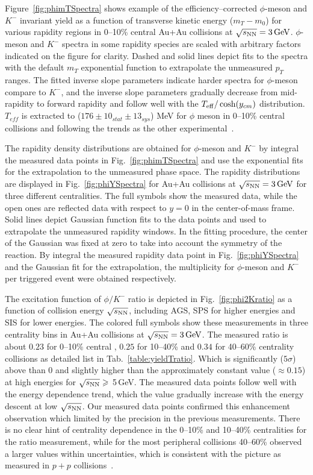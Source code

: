 \documentclass[%
 reprint,	
showpacs,
 amsmath,amssymb,
 aps,
 prc,
]{revtex4-1}
\begin{document}
Figure~\ref{fig:phimTSpectra} shows example of the efficiency--corrected $\phi$-meson and $K^-$ invariant yield as a function of transverse kinetic energy ($m_T-m_0$) for various rapidity regions in 0--10\% central Au+Au collisions at ${\sqrt{s_{\rm NN}} = \rm{3\,GeV}}$. $\phi$-meson and $K^-$ spectra in some rapidity species are scaled with arbitrary factors indicated on the figure for clarity. Dashed and solid lines depict fits to the spectra with the default $m_T$ exponential function to extrapolate the unmeasured $p_T$ ranges. The fitted inverse slope parameters indicate harder spectra for $\phi$-meson compare to $K^-$, and the inverse slope parameters gradually decrease from mid-rapidity to forward rapidity and follow well with the $T_{\rm eff}/\cosh(y_{cm})$ distribution. $T_{eff}$ is extracted to ($176\pm10_{stat}\pm13_{sys}$) MeV for $\phi$ meson in 0--10\% central collisions and following the trends as the other experimental~\cite{2018403,PhysRevC.80.025209,PhysRevC.78.044907}.


The rapidity density distributions are obtained for $\phi$-meson and $K^-$ by integral the measured data points in Fig.~\ref{fig:phimTSpectra} and use the exponential fits for the extrapolation to the unmeasured phase space. The rapidity distributions are displayed in Fig.~\ref{fig:phiYSpectra} for Au+Au collisions at ${\sqrt{s_{\rm NN}} = \rm{3\,GeV}}$ for three different centralities. The full symbols show the measured data, while the open ones are reflected data with respect to $y=0$ in the center-of-mass frame. Solid lines depict Gaussian function fits to the data points and used to extrapolate the unmeasured rapidity windows. In the fitting procedure, the center of the Gaussian was fixed at zero to take into account the symmetry of the reaction. By integral the measured rapidity data point in Fig.~\ref{fig:phiYSpectra} and the Gaussian fit for the extrapolation, the multiplicity for $\phi$-meson and $K^-$ per triggered event were obtained respectively.


The excitation function of $\phi/K^-$ ratio is depicted in Fig.~\ref{fig:phi2Kratio} as a function of collision energy $\sqrt{s_{\rm NN}}$, including AGS, SPS for higher energies and SIS for lower energies. The colored full symbols show these measurements in three centrality bins in Au+Au collisions at ${\sqrt{s_{\rm NN}} = \rm{3\,GeV}}$. The measured ratio is about $0.23$ for 0--10\% central , $0.25$ for 10--40\% and $0.34$ for 40--60\% centrality collisions as detailed list in Tab.~\ref{table:yieldTratio}.
Which is significantly ($5\sigma$) above than 0 and slightly higher than the approximately constant value ($\approx0.15$) at high energies for $\sqrt{s_{\rm NN}}\geqslant$ 5\,GeV. The measured data points follow well with the energy dependence trend, which the value gradually increase with the energy descent at low $\sqrt{s_{\rm NN}}$. Our measured data points confirmed this enhancement observation which limited by the precision in the previous measurements. There is no clear hint of centrality dependence in the 0--10\% and 10--40\% centralities for the ratio measurement, while for the most peripheral collisions 40--60\% observed a larger values within uncertainties, which is consistent with the picture as measured in $p+p$ collisions~\cite{PhysRevC.77.015204}.
\end{document}
